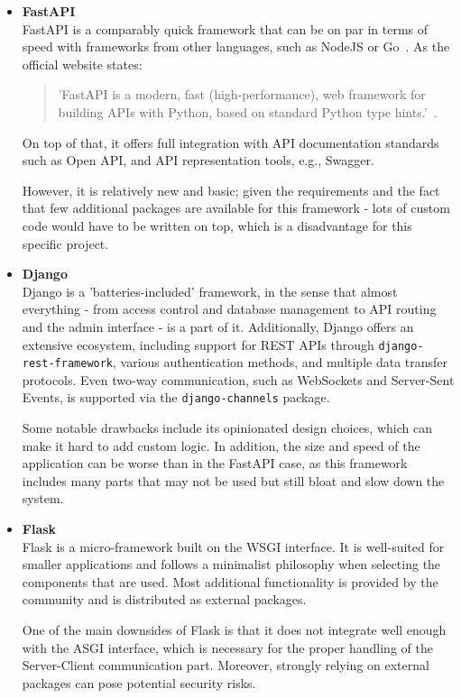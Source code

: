 \begin{itemize}
    \item \textbf{FastAPI} \\
    FastAPI is a comparably quick framework that can be on par in terms of speed with frameworks from other languages,
    such as NodeJS or Go~\cite{fastapi}.
    As the official website states:
    \begin{quote}
        'FastAPI is a modern, fast (high-performance), web framework for building APIs
        with Python, based on standard Python type hints.'~\cite{fastapi}. \\
    \end{quote}
    On top of that, it offers full integration with API documentation standards such as
    Open API, and API representation tools, e.g., Swagger.

    However, it is relatively new and basic; given the requirements and the fact that
    few additional packages are available for this framework - lots of custom code would have
    to be written on top, which is a disadvantage for this specific project.

    \item \textbf{Django} \\
    Django is a 'batteries-included' framework, in the sense that almost everything -
    from access control and database management to API routing and the admin interface -
    is a part of it.\cite{django}
    Additionally, Django offers an extensive ecosystem, including support for REST APIs through
    \texttt{django-rest-framework}\cite{drf}, various authentication methods,
    and multiple data transfer protocols. Even two-way communication, such as WebSockets and Server-Sent Events,
    is supported via the \texttt{django-channels}\cite{django_channels} package.

    Some notable drawbacks include its opinionated design choices, which can make it hard to add custom logic.
    In addition, the size and speed of the application can be worse than in the FastAPI case,
    as this framework includes many parts that may not be used but still bloat and slow down the system.

    \item \textbf{Flask} \\
    Flask is a micro-framework built on the WSGI interface.
    It is well-suited for smaller applications and follows a minimalist philosophy
    when selecting the components that are used.\cite{flask} Most additional functionality is provided by
    the community and is distributed as external packages.

    One of the main downsides of Flask is that it does not integrate well enough with the ASGI
    interface, which is necessary for the proper handling of the Server-Client communication part.
    Moreover, strongly relying on external packages can pose potential security risks.
\end{itemize}

